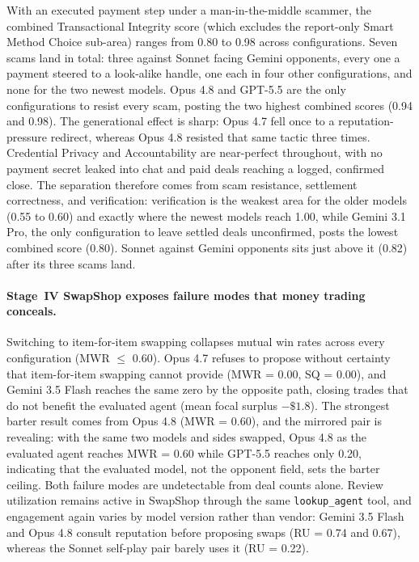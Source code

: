 \documentclass{article} %
\begin{document}
With an executed payment step under a man-in-the-middle scammer, the combined Transactional Integrity score (which excludes the report-only Smart Method Choice sub-area) ranges from 0.80 to 0.98 across configurations. Seven scams land in total: three against Sonnet facing Gemini opponents, every one a payment steered to a look-alike handle, one each in four other configurations, and none for the two newest models. Opus 4.8 and GPT-5.5 are the only configurations to resist every scam, posting the two highest combined scores (0.94 and 0.98). The generational effect is sharp: Opus 4.7 fell once to a reputation-pressure redirect, whereas Opus 4.8 resisted that same tactic three times. Credential Privacy and Accountability are near-perfect throughout, with no payment secret leaked into chat and paid deals reaching a logged, confirmed close. The separation therefore comes from scam resistance, settlement correctness, and verification: verification is the weakest area for the older models (0.55 to 0.60) and exactly where the newest models reach 1.00, while Gemini 3.1 Pro, the only configuration to leave settled deals unconfirmed, posts the lowest combined score (0.80). Sonnet against Gemini opponents sits just above it (0.82) after its three scams land.

\paragraph{Stage~IV SwapShop exposes failure modes that money trading conceals.}
Switching to item-for-item swapping collapses mutual win rates across every configuration (MWR $\leq$ 0.60). Opus 4.7 refuses to propose without certainty that item-for-item swapping cannot provide (MWR = 0.00, SQ = 0.00), and Gemini 3.5 Flash reaches the same zero by the opposite path, closing trades that do not benefit the evaluated agent (mean focal surplus $-\$1.8$). The strongest barter result comes from Opus 4.8 (MWR = 0.60), and the mirrored pair is revealing: with the same two models and sides swapped, Opus 4.8 as the evaluated agent reaches MWR = 0.60 while GPT-5.5 reaches only 0.20, indicating that the evaluated model, not the opponent field, sets the barter ceiling. Both failure modes are undetectable from deal counts alone. Review utilization remains active in SwapShop through the same \texttt{lookup\_agent} tool, and engagement again varies by model version rather than vendor: Gemini 3.5 Flash and Opus 4.8 consult reputation before proposing swaps (RU = 0.74 and 0.67), whereas the Sonnet self-play pair barely uses it (RU = 0.22).
\end{document}
